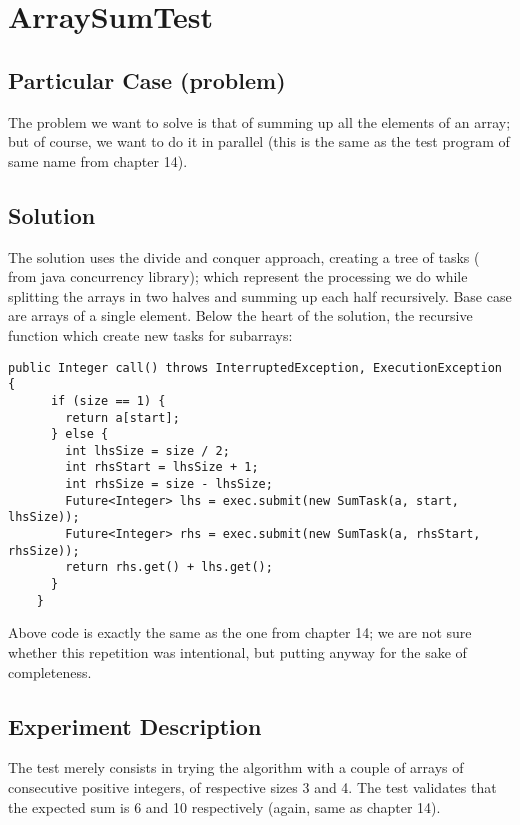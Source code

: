 \section{\textbf{ArraySumTest}}

\subsection{Particular Case (problem)}
The problem we want to solve is that of summing up all the elements of
an array; but of course, we want to do it in parallel (this is the
same as the test program of same name from chapter 14).

\subsection{Solution}
The solution uses the divide and conquer approach, creating a tree of
tasks ( from java concurrency library); which represent
the processing we do while splitting the arrays in two halves and summing up
each half recursively. Base case are arrays of a single element. Below
the heart of the solution, the recursive function which create new tasks
for subarrays: \\

\begin{lstlisting}[style=numbers]
    public Integer call() throws InterruptedException, ExecutionException {
      if (size == 1) {
        return a[start];
      } else {
        int lhsSize = size / 2;
        int rhsStart = lhsSize + 1;
        int rhsSize = size - lhsSize;
        Future<Integer> lhs = exec.submit(new SumTask(a, start, lhsSize));
        Future<Integer> rhs = exec.submit(new SumTask(a, rhsStart, rhsSize));
        return rhs.get() + lhs.get();
      }
    }
\end{lstlisting}
\hfill

Above code is exactly the same as the one from chapter 14; we are not
sure whether this repetition was intentional, but putting anyway for
the sake of completeness. 

\subsection{Experiment Description}
The test merely consists in trying the algorithm with a couple of
arrays of consecutive positive integers, of respective sizes 3 and
4. The test validates that the expected sum is 6 and 10 respectively
(again, same as chapter 14).

